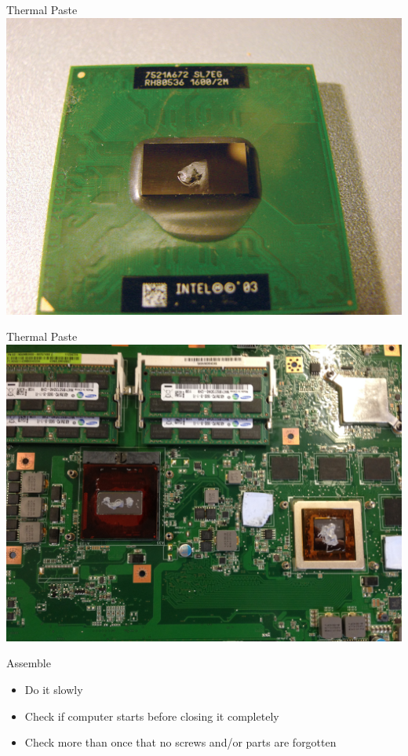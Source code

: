 \documentclass{beamer}
\begin{document}
\begin{frame}{Thermal Paste}
    \centering
    \includegraphics[scale=0.9]{tim-laptop-cpu}
\end{frame}

\begin{frame}{Thermal Paste}
    \centering
    \includegraphics[scale=0.08]{tim-laptop-cpu-gpu}
\end{frame}

\begin{frame}{Assemble}
    \begin{itemize}
        \item Do it slowly
        \item Check if computer starts before closing it completely
        \item Check more than once that no screws and/or parts are forgotten
    \end{itemize}
\end{frame}
\end{document}
